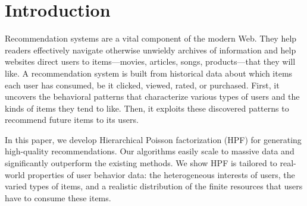 \section{Introduction}
Recommendation systems are a vital component of the modern Web.  They
help readers effectively navigate otherwise unwieldy archives of
information and help websites direct users to items---movies,
articles, songs, products---that they will like.  A recommendation
system is built from historical data about which items each user has
consumed, be it clicked, viewed, rated, or purchased. First, it
uncovers the behavioral patterns that characterize various types of
users and the kinds of items they tend to like.  Then, it exploits
these discovered patterns to recommend future items to its users.

In this paper, we develop Hierarchical Poisson factorization (HPF) for
generating high-quality recommendations. Our algorithms easily scale
to massive data and significantly outperform the existing methods. We
show HPF is tailored to real-world properties of user behavior data:
the heterogeneous interests of users, the varied types of items, and a
realistic distribution of the finite resources that users have to
consume these items.


